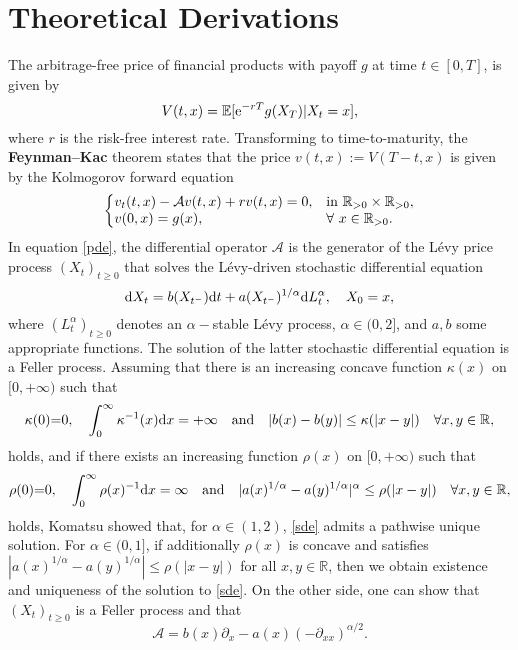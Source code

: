 \section{Theoretical Derivations}
The arbitrage-free price of financial products with payoff $g$ at time $t \in [0,T]$, is given by
\begin{equation*} \label{price_exp}
V(t,x) = \mathbb{E}[\text{e}^{-rT}g(X_T) | X_t=x], 
\end{equation*}
where $r$ is the risk-free interest rate. Transforming to time-to-maturity, the \textbf{Feynman--Kac} theorem states that the price $v(t,x):=V(T-t,x)$ is given by the Kolmogorov forward equation
\begin{equation} \label{pde}
\left\{
  \begin{array}{@{}ll@{}}
    v_t(t,x) - \mathcal{A}v(t,x) + rv(t,x) = 0, & \text{in}\ \mathbb{R}_{>0}\times\mathbb{R}_{>0}, \\
    v(0,x) = g(x), & \forall \ x\in\mathbb{R}_{>0}.
  \end{array}\right.
\end{equation} 
In equation \eqref{pde}, the differential operator $\mathcal{A}$ is the generator of the L\'{e}vy price process $(X_t)_{t\ge0}$ that solves the L\'{e}vy-driven stochastic differential equation
\begin{equation*} \label{levy_sde}
\der X_t = b(X_{t^-})\der t + a(X_{t^-})^{1/\alpha}\der L_t^{\alpha}, \ \ \ X_0=x, 
\end{equation*}
where $(L_t^{\alpha})_{t\ge0}$ denotes an $\alpha-$stable L\'{e}vy process, $\alpha \in (0,2]$, and $a,b$ some appropriate functions.
The solution of the latter stochastic differential equation is a Feller 
process\cite{Bottcher}. Assuming that there is an increasing concave function $\kappa(x)$ on $[0,+\infty)$ such that\cite{yamada}
\begin{equation*}
\kappa(0){=}0, \quad \int_{0}^{\infty}\kappa^{-1}(x)\text{d} x=+\infty\quad\text{and}\quad|b(x)-b(y)|\le\kappa(|x-y|)\quad\forall x,y\in\mathbb{R},
\end{equation*}
holds, and if there exists an increasing function $\rho(x)$ on $[0,+\infty)$ such that 
\begin{equation*}
\rho(0){=}0,\quad \int_{0}^{\infty}\rho(x)^{-1}\text{d} x = \infty\quad\text{and}\quad|a(x)^{1/\alpha} - a(y)^{1/\alpha}|^{\alpha} \le \rho(|x-y|)\quad\forall x,y \in \mathbb{R},
\end{equation*}
holds, Komatsu\cite{komatsu} showed that, for $\alpha \in (1,2)$, \eqref{sde} admits a pathwise unique solution. For $\alpha \in (0,1]$, if additionally $\rho(x)$ is concave and satisfies $|a(x)^{1/\alpha} - a(y)^{1/\alpha}| \le \rho(|x-y|)$ for all $x,y \in \mathbb{R}$, then we obtain existence and uniqueness of the solution to \eqref{sde}.
On the other side, one can show that $(X_t)_{t\ge0}$ is a Feller process\cite{Bottcher} and that
\begin{equation} \label{generator}
\mathcal{A} = b(x)\partial_x - a(x)(-\partial_{xx})^{\alpha/2}.
\end{equation}

